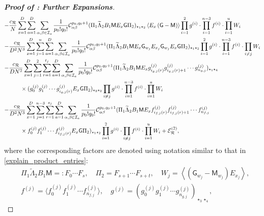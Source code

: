 \documentclass[10pt,reqno]{amsart}
\numberwithin{equation}{section}
\numberwithin{figure}{section}
\theoremstyle{plain} %
\theoremstyle{definition} %
\newcommand{\wt}{\widetilde}
\newcommand{\cI}{\mathcal{I}}
\newcommand{\cC}{\mathcal{C}}
\newcommand{\cR}{{\mathcal R}}
\newcommand{\cE}{{\mathcal{E}}}
\newcommand{\sG}{\mathsf G}
\newcommand{\sM}{\mathsf M}
\newcommand{\p}[1]{({#1})}
\newcommand{\pa}[1]{\left({#1}\right)}
\newcommand{\avg}[1]{\langle #1 \rangle}
\newcommand{\avga}[1]{\left\langle #1 \right\rangle}
\newcommand{\tLambda}{{\wt{\Lambda}}}
\newcommand{\bsum}[3]{\sum_{#1=1}^D\sum_{#2,#3\in \cI_{#1}}}
\newcommand{\iab}{\alpha\beta}
\newcommand{\tl}{\tLambda}
\numberwithin{equation}{section}
\begin{document}
\begin{proof}[\bf Proof of : Further Expansions]
\begin{align}
            -& \frac{c_\cR}{N} \sum_{x=1}^D\bsum{a}{\alpha}{\beta}\frac{1}{p_0!q_0!}\cC_{\iab}^{p_0,q_0+1}\p{\Pi_1\tl_2B_1\sM E_x \sG\Pi_2}_{\star_1\star_2}\avga{E_x\pa{\sG-\sM}}\prod_{i=1}^{2}g^{\pa{i}}\cdot\prod_{i=1}^{n-3}f^{\pa{i}}\cdot\prod_{i=1}^{u}W_i \notag\\
            -& \frac{c_\cR}{D^2 N^3} \sum_{x=1}^D \sum_{j=1}^u\bsum{a}{\alpha}{\beta}\frac{1}{p_0!q_0!}\cC_{\iab}^{p_0,q_0+1}\p{\Pi_1\tl_2B_1\sM E_x\sG_{w_j}E_{x_j}\sG_{w_j}E_x \sG\Pi_2}_{\star_1\star_2}\prod_{i=1}^{2}g^{\pa{i}}\cdot\prod_{i=1}^{n-3}f^{\pa{i}}\cdot \prod_{i \neq j} W_i \notag\\
            -& \frac{c_\cR}{D N^2} \sum_{x=1}^D \sum_{j=1}^2 \sum_{r=1}^{t_j}\bsum{a}{\alpha}{\beta}\frac{1}{p_0!q_0!}\cC_{\iab}^{p_0,q_0+1}\p{\Pi_1\tl_2B_1\sM E_x g_{i_{g,j}\pa{r}}^{\pa{j}} g_{i_{g,j}\pa{r}+1}^{\pa{j}}\cdots g_{n_{g,j}}^{\pa{j}}}_{\star_1\star_4}\notag\\
            &\qquad\times \p{ g_{0}^{\pa{j}} g_{1}^{\pa{j}}\cdots g_{i_{g,j}\pa{r}}^{\pa{j}} E_x \sG\Pi_2}_{\star_3\star_2} \prod_{i\neq j}g^{\pa{i}}\cdot\prod_{i=1}^{n-3}f^{\pa{i}}\cdot\prod_{i=1}^{u}W_i\notag\\
            -& \frac{c_\cR}{D^2 N^3} \sum_{x=1}^D \sum_{j=1}^{n-3} \sum_{r=1}^{s_j}\bsum{a}{\alpha}{\beta}\frac{1}{p_0!q_0!}\cC_{\iab}^{p_0,q_0+1}(\Pi_1\tl_2B_1\sM E_x f_{i_{f,j}\pa{r}}^{\pa{j}} f_{i_{f,j}\pa{r}+1}^{\pa{j}}\cdots f_{n_{f,j}}^{\pa{j}}\notag\\
            &\qquad\times f_{0}^{\pa{j}} f_{1}^{\pa{j}}\cdots f_{i_{f,j}\pa{r}}^{\pa{j}} E_x \sG\Pi_2)_{\star_1\star_2} \prod_{i=1}^{2}g^{\pa{i}}\cdot\prod_{i\neq j}f^{\pa{i}}\cdot\prod_{i=1}^{u}W_i+\cE_{\cR}^{\pa{2}},
        \end{align}
    where the corresponding factors are denoted using notation similar to that in \eqref{explain_product_entries}: %
    \begin{equation}\nonumber
        \begin{aligned}
        &\Pi_{1}\tLambda_2 B_1\sM =: F_0 \cdots F_s,\quad \Pi_2=F_{s+1}\cdots F_{s+t},\quad W_j=\left\langle\left(\sG_{w_j}-\sM_{w_j}\right) E_{x_j}\right\rangle, \\
        &f^{(j)}=\avg{ f_0^{(j)} f_1^{(j)} \cdots f_{n_{f,j}}^{(j)}},\quad g^{(j)}=( g_0^{(j)} g_1^{(j)} \cdots g_{n_{g,j}}^{(j)})_{\star_3\star_4},
        \end{aligned}
    \end{equation}

\end{proof}
\end{document}
